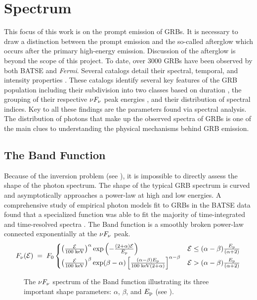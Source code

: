 \section{Spectrum}
\label{sec:spectrum}
This focus of this work is on the prompt emission of GRBs. It is
necessary to draw a distinction between the prompt emission and the
so-called afterglow which occurs after the primary high-energy
emission. Discussion of the afterglow is beyond the scope of this
project. To date, over 3000 GRBs have been observed by both BATSE and {\it
  Fermi}. Several catalogs detail their spectral, temporal, and
intensity properties
\cite{Goldstein:2012,Kaneko:2006,Nava:2011}. These catalogs identify
several key features of the GRB population including their subdivision
into two classes based on duration \cite{ck:1993}, the grouping of
their respective $\nu F_{\nu}$ peak energies \cite{Schaefer:2003}, and their
distribution of spectral indices. Key to all these findings are the
 parameters found via spectral analysis. The distribution of
photons that make up the observed spectra of GRBs is one of the main
clues to understanding the physical mechanisms behind GRB emission.
\subsection{The Band Function}
\label{sec:bandfunc}
Because of the inversion problem (see ), it is impossible to directly assess
the shape of the photon spectrum. The shape of the typical
GRB spectrum is curved and asymptotically approaches a power-law at
high and low energies. A comprehensive study of empirical photon
models fit to GRBs in the BATSE data found that a specialized function
was able to fit the majority of time-integrated and time-resolved
spectra \cite{band:1993}. The Band function is a smoothly broken
power-law connected exponentially at the $\nu F_{\nu}$ peak.
\begin{equation}
  \label{eq:band}
   F_{\nu}(\mathcal{E})\;=\;F_0
  \begin{cases}
    {\left(\frac{\mathcal{E}}{\rm 100\;keV}\right)^{\alpha} {\rm exp}\left(-\frac{(2+\alpha)\mathcal{E}}{E_{\rm p}}\right)} & {\mathcal{E}\le (\alpha-\beta)\frac{E_{\rm p}}{ (\alpha+2)} }\\
    {\left(\frac{\mathcal{E}}{\rm 100\;keV}\right)^{\beta}{\rm
        exp}{\left(\beta-\alpha\right)}\left[\frac{(\alpha-\beta)E_{\rm
            p}}{{\rm 100\;keV} (2+\alpha)}\right]^{\alpha-\beta}} &
    {\mathcal{E}>(\alpha-\beta)\frac{E_{\rm p}}{ (\alpha+2)} }
  \end{cases}
\end{equation}
\begin{figure}[t]
  \centering
  \caption{The $\nu F_{\nu}$ spectrum of the Band function illustrating its
    three important shape parameters: $\alpha$, $\beta$, and $E_{\rm p}$
    (see ).}
  \label{fig:bandSpecEx}
\end{figure}




